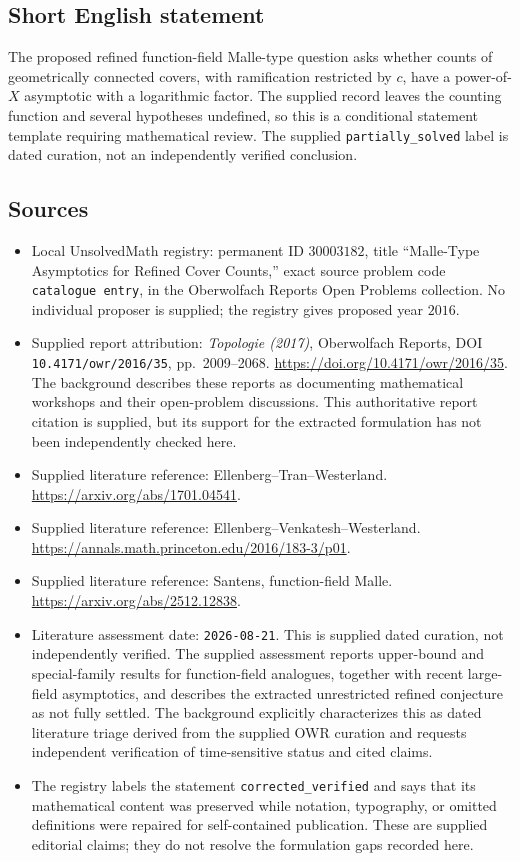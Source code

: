 \documentclass[11pt]{article}
\begin{document}
\subsection{Short English statement}
The proposed refined function-field Malle-type question asks whether counts of geometrically connected covers, with ramification restricted by \(c\), have a power-of-\(X\) asymptotic with a logarithmic factor. The supplied record leaves the counting function and several hypotheses undefined, so this is a conditional statement template requiring mathematical review. The supplied \texttt{partially\_solved} label is dated curation, not an independently verified conclusion.
\subsection{Sources}
\begin{itemize}
\item Local UnsolvedMath registry: permanent ID \(30003182\), title ``Malle-Type Asymptotics for Refined Cover Counts,'' exact source problem code \texttt{catalogue entry}, in the Oberwolfach Reports Open Problems collection. No individual proposer is supplied; the registry gives proposed year \(2016\).
\item Supplied report attribution: \emph{Topologie (2017)}, Oberwolfach Reports, DOI \texttt{10.4171/owr/2016/35}, pp.~2009--2068. \url{https://doi.org/10.4171/owr/2016/35}. The background describes these reports as documenting mathematical workshops and their open-problem discussions. This authoritative report citation is supplied, but its support for the extracted formulation has not been independently checked here.
\item Supplied literature reference: Ellenberg--Tran--Westerland. \url{https://arxiv.org/abs/1701.04541}.
\item Supplied literature reference: Ellenberg--Venkatesh--Westerland. \url{https://annals.math.princeton.edu/2016/183-3/p01}.
\item Supplied literature reference: Santens, function-field Malle. \url{https://arxiv.org/abs/2512.12838}.
\item Literature assessment date: \texttt{2026-08-21}. This is supplied dated curation, not independently verified. The supplied assessment reports upper-bound and special-family results for function-field analogues, together with recent large-field asymptotics, and describes the extracted unrestricted refined conjecture as not fully settled. The background explicitly characterizes this as dated literature triage derived from the supplied OWR curation and requests independent verification of time-sensitive status and cited claims.
\item The registry labels the statement \texttt{corrected\_verified} and says that its mathematical content was preserved while notation, typography, or omitted definitions were repaired for self-contained publication. These are supplied editorial claims; they do not resolve the formulation gaps recorded here.
\end{itemize}
\end{document}
